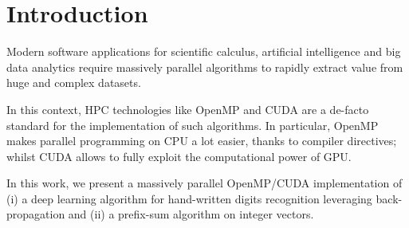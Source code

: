 \section{Introduction}
\label{sec:introduction}

Modern software applications for scientific calculus, artificial intelligence and big data analytics require massively parallel algorithms to rapidly extract value from huge and complex datasets.

In this context, HPC technologies like OpenMP and CUDA are a de-facto standard for the implementation of such algorithms.
%
In particular, OpenMP makes parallel programming on CPU a lot easier, thanks to compiler directives; whilst CUDA allows to fully exploit the computational power of GPU.

In this work, we present a massively parallel OpenMP/CUDA implementation of (i) a deep learning algorithm for hand-written digits recognition leveraging back-propagation and (ii) a prefix-sum algorithm on integer vectors.

